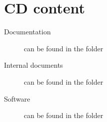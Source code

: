 \chapter{CD content}

\begin{description}
\item[Documentation] can be found in the folder 
\item[Internal documents] can be found in the folder 
\item[Software] can be found in the folder 
\end{description}
